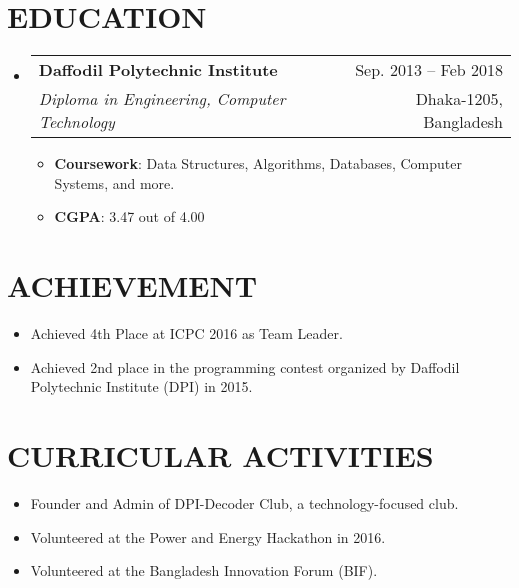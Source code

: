 \documentclass[letterpaper,11pt]{article}
\makeatletter
\newcommand{\resumeItem}[1]{
  \item\small{
    {#1 \vspace{-1pt}}
  }
}
\newcommand{\resumeSubheading}[4]{
  \vspace{-1pt}\item
    \begin{tabular*}{\textwidth}[t]{l@{\extracolsep{\fill}}r}
      \textbf{#1} & {\color{dark-grey}\small #2}\vspace{1pt}\\ %
      \textit{#3} & {\color{dark-grey} \small #4}\\ %
    \end{tabular*}\vspace{-4pt}
}
\newcommand{\resumeSubHeadingListStart}{\begin{itemize}[leftmargin=0in, label={}]}
\newcommand{\resumeSubHeadingListEnd}{\end{itemize}}
\newcommand{\resumeItemListStart}{\begin{itemize}}
\newcommand{\resumeItemListEnd}{\end{itemize}\vspace{0pt}}
\makeatother
\begin{document}
\section {EDUCATION}
  \resumeSubHeadingListStart
    \resumeSubheading
      {Daffodil Polytechnic Institute}{Sep. 2013 -- Feb 2018}
      {Diploma in Engineering, Computer Technology}{Dhaka-1205, Bangladesh}
      	\resumeItemListStart
    	    \resumeItem {\textbf{Coursework}:  Data Structures, Algorithms, Databases, Computer Systems, and more.}
          \resumeItem {\textbf{CGPA}: 3.47 out of 4.00}
        \resumeItemListEnd
  \resumeSubHeadingListEnd

\section{ACHIEVEMENT}
        \resumeItemListStart
    	    \resumeItem {Achieved 4th Place at ICPC 2016 as Team Leader.}
    	    \resumeItem {Achieved 2nd place in the programming contest organized by Daffodil Polytechnic Institute (DPI) in 2015.}
        \resumeItemListEnd

\section{CURRICULAR ACTIVITIES}
        \resumeItemListStart
    	    \resumeItem {Founder and Admin of DPI-Decoder Club, a technology-focused club.}
    	    \resumeItem {Volunteered at the Power and Energy Hackathon in 2016.}
    	    \resumeItem {Volunteered at the Bangladesh Innovation Forum (BIF).}
        \resumeItemListEnd

\end{document}
